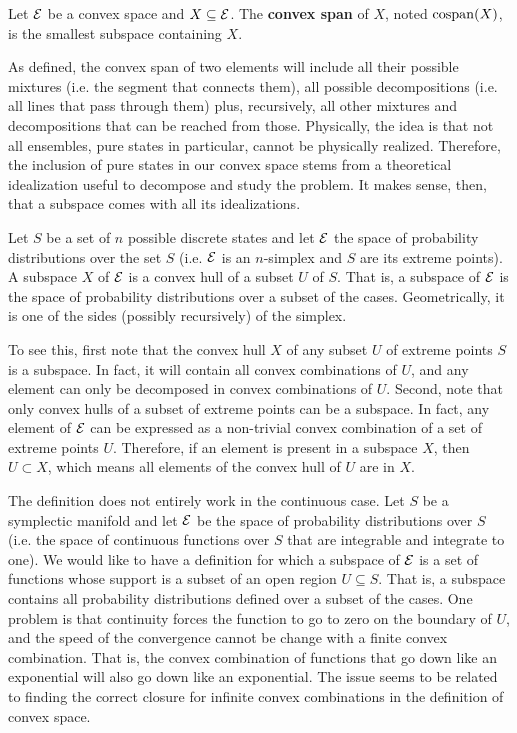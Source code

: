 \begin{defn}
	Let $\mathcal{E}$ be a convex space and $X \subseteq \mathcal{E}$.  The \textbf{convex span} of $X$, noted $\mathrm{cospan}(X)$, is the smallest subspace containing $X$.
\end{defn}

\begin{remark}
	As defined, the convex span of two elements will include all their possible mixtures (i.e. the segment that connects them), all possible decompositions (i.e. all lines that pass through them) plus, recursively, all other mixtures and decompositions that can be reached from those. Physically, the idea is that not all ensembles, pure states in particular, cannot be physically realized. Therefore, the inclusion of pure states in our convex space stems from a theoretical idealization useful to decompose and study the problem. It makes sense, then, that a subspace comes with all its idealizations.
\end{remark}

\begin{example}
	Let $S$ be a set of $n$ possible discrete states and let $\mathcal{E}$ the space of probability distributions over the set $S$ (i.e. $\mathcal{E}$ is an $n$-simplex and $S$ are its extreme points). A subspace $X$ of $\mathcal{E}$ is a convex hull of a subset $U$ of $S$. That is, a subspace of $\mathcal{E}$ is the space of probability distributions over a subset of the cases. Geometrically, it is one of the sides (possibly recursively) of the simplex.
	
	To see this, first note that the convex hull $X$ of any subset $U$ of extreme points $S$ is a subspace. In fact, it will contain all convex combinations of $U$, and any element can only be decomposed in convex combinations of $U$. Second, note that only convex hulls of a subset of extreme points can be a subspace. In fact, any element of $\mathcal{E}$ can be expressed as a non-trivial convex combination of a set of extreme points $U$. Therefore, if an element is present in a subspace $X$, then $U \subset X$, which means all elements of the convex hull of $U$ are in $X$.
\end{example}

\begin{remark}
	The definition does not entirely work in the continuous case. Let $S$ be a symplectic manifold and let $\mathcal{E}$ be the space of probability distributions over $S$ (i.e. the space of continuous functions over $S$ that are integrable and integrate to one). We would like to have a definition for which a subspace of $\mathcal{E}$ is a set of functions whose support is a subset of an open region $U \subseteq S$. That is, a subspace contains all probability distributions defined over a subset of the cases. One problem is that continuity forces the function to go to zero on the boundary of $U$, and the speed of the convergence cannot be change with a finite convex combination. That is, the convex combination of functions that go down like an exponential will also go down like an exponential. The issue seems to be related to finding the correct closure for infinite convex combinations in the definition of convex space.
\end{remark}

